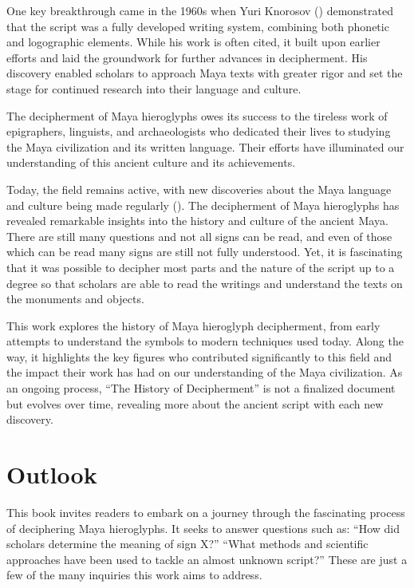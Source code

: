 \documentclass[../main.tex]{subfiles}
\begin{document}
One key breakthrough came in the 1960s when Yuri Knorosov (\cite{knorozov1967}) demonstrated that 
the script was a fully developed writing system, combining both phonetic and logographic elements. 
While his work is often cited, it built upon earlier efforts and laid the groundwork for further 
advances in decipherment. 
His discovery enabled scholars to approach Maya texts with greater rigor and set the 
stage for continued research into their language and culture.

The decipherment of Maya hieroglyphs owes its success to the tireless work of epigraphers, 
linguists, and archaeologists who dedicated their lives to studying the Maya civilization and 
its written language. 
Their efforts have illuminated our understanding of this ancient culture and its achievements.

Today, the field remains active, with new discoveries about the Maya language and culture 
being made regularly (\cite{zender2017}). 
The decipherment of Maya hieroglyphs has revealed remarkable insights 
into the history and culture of the ancient Maya.
There are still many questions and not all signs can be read, and even of those which can be read
many signs are still not fully understood.
Yet, it is fascinating that it was possible to decipher most parts
and the nature of the script up to a degree so that scholars are able to read the writings and 
understand the texts on the monuments and objects.

This work explores the history of Maya hieroglyph decipherment, from early attempts to understand 
the symbols to modern techniques used today. 
Along the way, it highlights the key figures who contributed significantly to this 
field and the impact their work has had on our understanding of the Maya civilization. 
As an ongoing process, ``The History of Decipherment'' is not a finalized document but evolves over 
time, revealing more about the ancient script with each new discovery.

\section{Outlook}
This book invites readers to embark on a journey through the fascinating process of 
deciphering Maya hieroglyphs. 
It seeks to answer questions such as: 
\enquote{How did scholars determine the meaning of sign X?} 
\enquote{What methods and scientific approaches have been used to tackle an almost unknown script?} 
These are just a few of the many inquiries this work aims to address.
\end{document}
